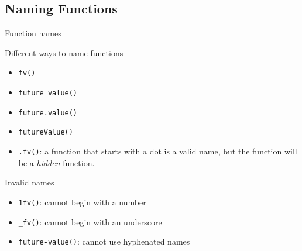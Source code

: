 \documentclass[
]{book}
\begin{document}
\hypertarget{naming-functions}{%
\subsection{Naming Functions}\label{naming-functions}}

Function names

Different ways to name functions

\begin{itemize}
\item
  \texttt{fv()}
\item
  \texttt{future\_value()}
\item
  \texttt{future.value()}
\item
  \texttt{futureValue()}
\item
  \texttt{.fv()}: a function that starts with a dot is a valid name, but the
  function will be a \emph{hidden} function.
\end{itemize}

Invalid names

\begin{itemize}
\item
  \texttt{1fv()}: cannot begin with a number
\item
  \texttt{\_fv()}: cannot begin with an underscore
\item
  \texttt{future-value()}: cannot use hyphenated names
\end{itemize}

  
\end{document}

